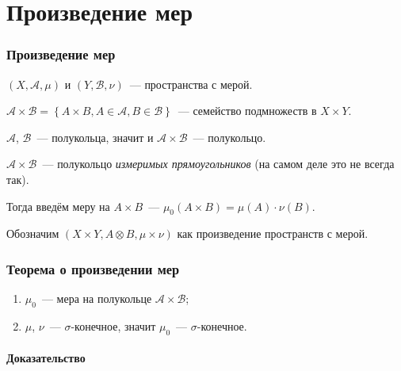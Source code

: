 \documentclass{article}
\begin{document}
\part{Произведение мер}

\newpage

    \section{Произведение мер}
    
        $(X, \mathcal{A}, \mu)$ и $(Y, \mathcal{B}, \nu)$~--- пространства с мерой.
   
        $\mathcal{A} \times \mathcal{B} = \left\{ A \times B, A \in \mathcal{A}, B \in \mathcal{B} \right\}$~--- семейство подмножеств в $X \times Y$.
        
        $\mathcal{A}$, $\mathcal{B}$~--- полукольца, значит и $\mathcal{A} \times \mathcal{B}$~--- полукольцо.
                
        $\mathcal{A} \times \mathcal{B}$~--- полукольцо \textit{измеримых прямоугольников} (на самом деле это не всегда так).
            
            
        Тогда введём меру на $A \times B$~--- $\mu_0 (A \times B) = \mu(A) \cdot \nu(B)$.
        
        Обозначим $(X \times Y, A \otimes B, \mu \times \nu)$ как произведение пространств с мерой.
        
    \newpage
    
    \section{Теорема о произведении мер}
        
        \begin{enumerate}
        
            \item $\mu_0$~--- мера на полукольце $\mathcal{A} \times \mathcal{B}$;
            
            \item $\mu$, $\nu$~--- $\sigma$-конечное, значит $\mu_0$~--- $\sigma$-конечное.
            
        \end{enumerate}
        
        \subsection{Доказательство}
        
\end{document}
